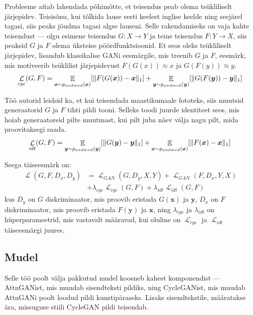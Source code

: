 \documentclass{vilgym}
\DeclareMathOperator{\EX}{\mathbb{E}}
\DeclareMathOperator{\loss}{\mathcal{L}}
\DeclarePairedDelimiter{\norm}{\lVert}{\rVert}
\begin{document}
	Probleeme aitab lahendada põhimõtte, et teisendus peab olema tsükliliselt järjepidev. Teisisõnu, kui tõlkida lause eesti keelest inglise keelde ning seejärel tagasi, siis peaks jõudma tagasi algse lauseni. Selle rakendamiseks on vaja kahte teisendust --- olgu esimene teisendus $ G: X \rightarrow Y $ ja teine teisendus $F: Y \rightarrow X $, siis peaksid $ G $ ja $ F $ olema üksteise pöördfunktsioonid. Et seos oleks tsükliliselt järjepidev, lisandub klassikalise GANi eesmärgile, mis treenib $ G $ ja $ F $, eesmärk, mis motiveerib tsüklilist järjepidevust $ F(G(x)) \approx x $ ja $ G(F(y)) \approx y $.
	\begin{equation}
		\loss_{cyc}(G,F) = \EX_{\boldsymbol{x}\sim p_{andmed}(\boldsymbol{x})}[\norm{F(G(\boldsymbol{x})) - \boldsymbol{x}}_1] + \EX_{\boldsymbol{y}\sim p_{andmed}(\boldsymbol{y})}[\norm{G(F(\boldsymbol{y})) - \boldsymbol{y}}_1]
	\end{equation}

	Töö autorid leidsid ka, et kui teisendada maastikumaale fototeks, siis muutsid generaatorid $ G $ ja $ F $ tihti pildi tooni. Selleks toodi	juurde identiteet seos, mis hoiab generaatoreid pilte muutmast, kui pilt juba näev välja nagu pilt, mida proovitaksegi saada.
	\begin{equation}
		\loss_{idt}(G,F) = \EX_{\boldsymbol{y}\sim p_{andmed}(\boldsymbol{y})}[\norm{G(\boldsymbol{y}) - \boldsymbol{y}}_1] + \EX_{\boldsymbol{x}\sim p_{andmed}(\boldsymbol{x})}[\norm{F(\boldsymbol{x}) - \boldsymbol{x}}_1]
	\end{equation}

	Seega täiseesmärk on:
	\begin{equation}
		\begin{aligned}
			\loss(G, F, D_x, D_y) &= \loss_{GAN}(G, D_y, X, Y) + \loss_{GAN}(F, D_x, Y, X) \\
								  &+ \lambda_{cyc} \loss_{cyc}(G, F) + \lambda_{idt} \loss_{idt}(G, F)
		\end{aligned}
	\end{equation}
	kus $ D_y $ on $ G $ diskriminaator, mis proovib eristada $ G(\boldsymbol{x}) $ ja $ \boldsymbol{y} $, $ D_x $ on  $ F $ diskriminaator, mis proovib eristada $ F(\boldsymbol{y}) $ ja $ \boldsymbol{x} $, ning $ \lambda_{cyc} $ ja $ \lambda_{idt} $ on hüperparameetrid, mis vastavalt määravad, kui oluline on $ \loss_{cyc} $ ja $ \loss_{idt} $ täiseesmärgi juures. \parencite{cyclegan}

	\subsection{Mudel}
	Selle töö poolt välja pakkutud mudel koosneb kahest komponendist --- AttnGANist, mis muudab sisendteksti pildiks, ning CycleGANist, mis muudab AttnGANi poolt loodud pildi kunstipäraseks. Lisaks sisendtekstile, määratakse ära, missuguse stiili CycleGAN pildi teisendab.
\end{document}
